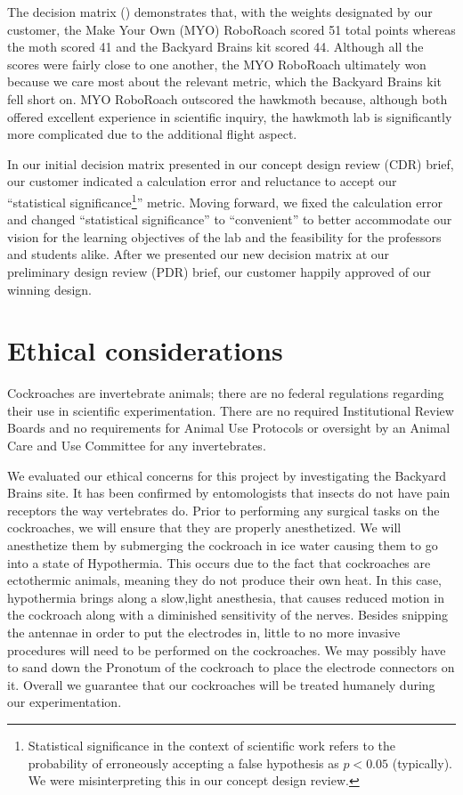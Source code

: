 \documentclass[twocolumn,10pt]{IEEEtran}
\begin{document}
The decision matrix () demonstrates that, with the weights designated by our customer, the Make Your Own (MYO) RoboRoach scored 51 total points whereas the moth scored 41 and the Backyard Brains kit scored 44. Although all the scores were fairly close to one another, the MYO RoboRoach ultimately won because we care most about the relevant metric, which the Backyard Brains kit fell short on. MYO RoboRoach outscored the hawkmoth because, although both offered excellent experience in scientific inquiry, the hawkmoth lab is significantly more complicated due to the additional flight aspect.

In our initial decision matrix presented in our concept design review (CDR) brief, our customer indicated a calculation error and reluctance to accept our ``statistical significance\footnote{Statistical significance in the context of scientific work refers to the probability of erroneously accepting a false hypothesis as $p<0.05$ (typically). We were misinterpreting this in our concept design review.}'' metric. Moving forward, we fixed the calculation error and changed ``statistical significance'' to ``convenient'' to better accommodate our vision for the learning objectives of the lab and the feasibility for the professors and students alike. After we presented our new decision matrix at our preliminary design review (PDR) brief, our customer happily approved of our winning design.

\section{Ethical considerations}
Cockroaches are invertebrate animals; there are no federal regulations regarding their use in scientific experimentation. There are no required Institutional Review Boards and no requirements for Animal Use Protocols or oversight by an Animal Care and Use Committee for any invertebrates.

We evaluated our ethical concerns for this project by investigating the Backyard Brains site. It has been confirmed by entomologists that insects do not have pain receptors the way vertebrates do. Prior to performing any surgical tasks on the cockroaches, we will ensure that they are properly anesthetized. We will anesthetize them by submerging the cockroach in ice water causing them to go into a state of Hypothermia. This occurs due to the fact that cockroaches are ectothermic animals, meaning they do not produce their own heat. In this case, hypothermia brings along a slow,light anesthesia, that causes reduced motion in the cockroach along with a diminished sensitivity of the nerves. Besides snipping the antennae in order to put the electrodes in, little to no more invasive procedures will need to be performed on the cockroaches. We may possibly have to sand down the Pronotum of the cockroach to place the electrode connectors on it. Overall we guarantee that our cockroaches will be treated humanely during our experimentation.
\end{document}
